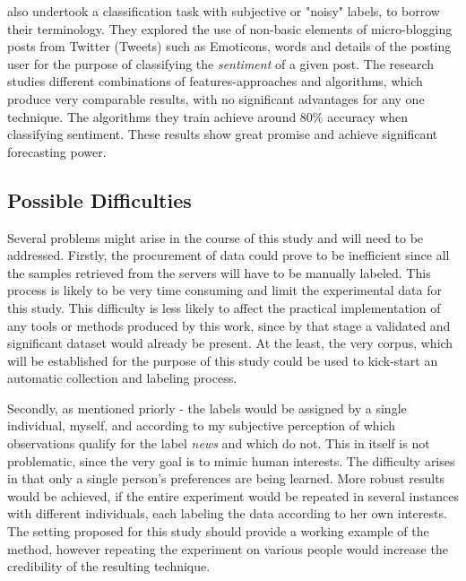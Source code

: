 		\par
		
		\cite*{go2009twitter} also undertook a classification task with subjective or "noisy" labels, to borrow their terminology. They explored the use of non-basic elements of micro-blogging posts from Twitter (Tweets) such as Emoticons, words and details of the posting user for the purpose of classifying the \textit{sentiment} of a given post. The research studies different combinations of features-approaches and algorithms, which produce very comparable results, with no significant advantages for any one technique. The algorithms they train achieve around 80\% accuracy when classifying sentiment. These results show great promise and achieve significant forecasting power.
		
	\subsection{Possible Difficulties}
		Several problems might arise in the course of this study and will need to be addressed. Firstly, the procurement of data could prove to be inefficient since all the samples retrieved from the servers will have to be manually labeled. This process is likely to be very time consuming and limit the experimental data for this study. This difficulty is less likely to affect the practical implementation of any tools or methods produced by this work, since by that stage a validated and significant dataset would already be present. At the least, the very corpus, which 
		will be established for the purpose of this study could be used to kick-start an automatic collection and labeling process.
		
		\par 
		
		Secondly, as mentioned priorly - the labels would be assigned by a single individual, myself, and according to my subjective perception of which observations qualify for the label \textit{news} and which do not. This in itself is not problematic, since the very goal is to mimic human interests. The difficulty arises in that only a single person's preferences are being learned. More robust results would be achieved, if the entire experiment would be repeated in several instances with different individuals, each labeling the data according to her own interests. The setting proposed for this study should provide a working example of the method, however repeating the experiment on various people would increase the credibility of the resulting technique. 
		
